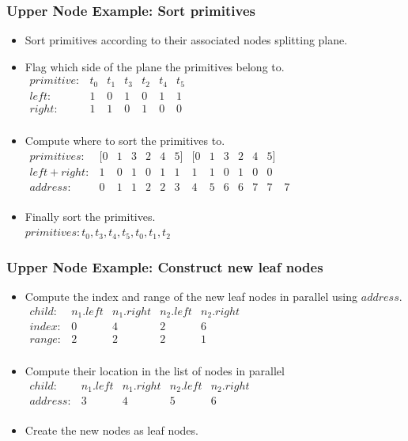 \documentclass{beamer}
\begin{document}
\begin{frame}
  \frametitle{Upper Node Example: Sort primitives}
  
  \begin{itemize}
  \item Sort primitives according to their associated nodes splitting plane.
  \item Flag which side of the plane the primitives belong to.\\
    $\begin{array}{lcccccc}
      primitive: & t_0 & t_1 & t_3 & t_2 & t_4 & t_5 \\
      left:  & 1 & 0 & 1 & 0 & 1 & 1 \\
      right: & 1 & 1 & 0 & 1 & 0 & 0 \\
    \end{array}$
  \item Compute where to sort the primitives to.\\
    $\begin{array}{lccccccccccccc}
      primitives: & [0 & 1 & 3 & 2 & 4 & 5] & [0 & 1 & 3 & 2 & 4 & 5] \\
      left+right: & 1 & 0 & 1 & 0 & 1 & 1 & 1 & 1 & 0 & 1 & 0 & 0 \\
      address:    & 0 & 1 & 1 & 2 & 2 & 3 & 4 & 5 & 6 & 6 & 7 & 7 & 7 \\
    \end{array}$
  \item Finally sort the primitives.\\
    $primitives: t_0, t_3, t_4, t_5, t_0, t_1, t_2$
  \end{itemize}
\end{frame}

\begin{frame}
  \frametitle{Upper Node Example: Construct new leaf nodes}
  \begin{itemize}
    \item Compute the index and range of the new leaf nodes in parallel using
      $address$.\\
      $\begin{array}{lcccc}
        child: & n_1.left & n_1.right & n_2.left & n_2.right \\
        index: & 0 & 4 & 2 & 6 \\
        range: & 2 & 2 & 2 & 1 \\
      \end{array}$
    \item Compute their location in the list of nodes in parallel\\
      $\begin{array}{lcccc}
        child: & n_1.left & n_1.right & n_2.left & n_2.right \\
        address: & 3 & 4 & 5 & 6 \\
      \end{array}$
    \item Create the new nodes as leaf nodes.\\
  \end{itemize}
\end{frame}
\end{document}
